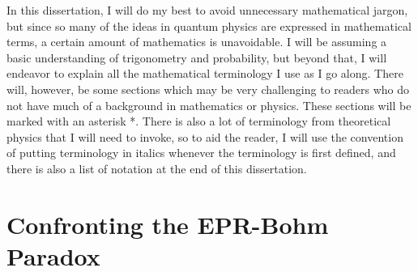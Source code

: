 \documentclass[12pt]{report}
\providecommand{\DIFaddbegin}{} %
\providecommand{\DIFaddend}{} %
\begin{document}
In this dissertation, I will do my best to avoid unnecessary mathematical jargon, but since so many of the ideas in quantum physics are expressed in mathematical terms, a certain amount of mathematics is unavoidable. I will be assuming a basic understanding of trigonometry and probability, but beyond that, I will endeavor to explain all the mathematical terminology I use as I go along. There will, however, be some sections which may be very challenging to readers who do not have much of a background in mathematics or physics. These sections will be marked with an asterisk *.\label{asteriskmeaning} There is also a lot of terminology from theoretical physics that I will need to invoke, so to aid the reader, I will use the convention of putting terminology in italics whenever the terminology is first defined, and there is also a list of notation at the end of this dissertation.

\DIFaddbegin \newpage 
\DIFaddend %

    \chapter{Confronting the EPR-Bohm Paradox\label{BellChapter}}
\end{document}
